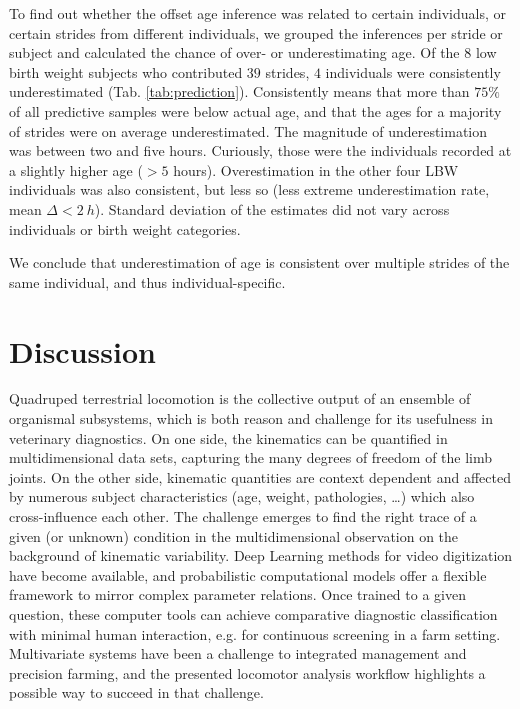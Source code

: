 To find out whether the offset age inference was related to certain individuals, or certain strides from different individuals, we grouped the inferences per stride or subject and calculated the chance of over- or underestimating age.
Of the
\(8\)
low birth weight subjects who contributed
\(39\)
strides,
\(4\)
individuals were consistently underestimated (Tab. \ref{tab:prediction}).
Consistently means that more than \(75 \%\) of all predictive samples were below actual age, and that the ages for a majority of strides were on average underestimated.
The magnitude of underestimation was between two and five hours.
Curiously, those were the individuals recorded at a slightly higher age (\(> 5\) hours).
Overestimation in the other four LBW individuals was also consistent, but less so (less extreme underestimation rate, mean \(\Delta < 2\ h\)).
Standard deviation of the estimates did not vary across individuals or birth weight categories.

We conclude that underestimation of age is consistent over multiple strides of the same individual, and thus individual-specific.

\FloatBarrier
\clearpage
\section{Discussion}
\label{discussion}
Quadruped terrestrial locomotion is the collective output of an ensemble of organismal subsystems, which is both reason and challenge for its usefulness in veterinary diagnostics.
On one side, the kinematics can be quantified in multidimensional data sets, capturing the many degrees of freedom of the limb joints.
On the other side, kinematic quantities are context dependent and affected by numerous subject characteristics (age, weight, pathologies, \ldots{}) which also cross-influence each other.
The challenge emerges to find the right trace of a given (or unknown) condition in the multidimensional observation on the background of kinematic variability.
Deep Learning methods for video digitization have become available, and probabilistic computational models offer a flexible framework to mirror complex parameter relations.
Once trained to a given question, these computer tools can achieve comparative diagnostic classification with minimal human interaction, e.g. for continuous screening in a farm setting.
Multivariate systems have been a challenge to integrated management and precision farming, and the presented locomotor analysis workflow highlights a possible way to succeed in that challenge.


